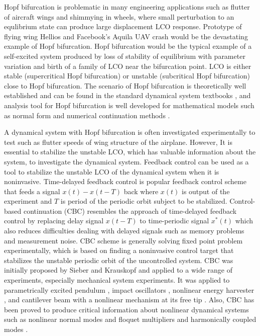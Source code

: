 \documentclass[openacc]{rsproca_new}%
\begin{document}
Hopf bifurcation is problematic in many engineering applications such as flutter of aircraft wings and shimmying in wheels, where small perturbation to an equlibrium state can produce large displacement LCO response. Prototype of flying wing Hellios \cite{noll2004investigation} and Facebook's Aquila UAV crash would be the devastating example of Hopf bifurcation. Hopf bifurcation would be the typical example of a self-excited system produced by loss of stability of equilibrium with parameter variation and birth of a family of LCO near the bifurcation point. LCO is either stable (supercritical Hopf bifurcation) or unstable (subcritical Hopf bifurcation) close to Hopf bifurcation. The scenario of Hopf bifurcation is theoretically well established and can be found in the standard dynamical system textbooks \cite{kuznetsov2013elements}, and analysis tool for Hopf bifurcation is well developed for mathematical models such as normal form \cite{yu2002simplest,ashwin1995numerical} and numerical continuation methods \cite{doedel2000auto2000,dankowicz2013recipes}.

A dynamical system with Hopf bifurcation is often investigated experimentally to test such as flutter speeds of wing structure of the airplane. However, It is essential to stabilize the unstable LCO, which has valuable information about the system, to investigate the dynamical system. Feedback control can be used as a tool to stabilize the unstable LCO of the dynamical system when it is noninvasive. Time-delayed feedback control \cite{pyragas2006delayed,sieber2016generic} is popular feedback control scheme that feeds a signal $x(t)-x(t-T)$ back where $x(t)$ is output of the experiment and $T$ is period of the periodic orbit subject to be stabilized. Control-based continuation (CBC) resembles the approach of time-delayed feedback control by replacing delay signal $x(t-T)$ to time-periodic signal $x^*(t)$ which also reduces difficulties dealing with delayed signals such as memory problems and measurement noise. CBC scheme is generally solving fixed point problem experimentally, which is based on finding a noninvasive control target that stabilizes the unstable periodic orbit of the uncontrolled system. CBC was initially proposed by Sieber and Krauskopf \cite{sieber2008control} and applied to a wide range of experiments, especially mechanical system experiments. It was applied to parametrically excited pendulum \cite{sieber2011control}, impact oscillators \cite{bureau2013experimental,bureau2014experimental}, nonlinear energy harvester \cite{barton2013systematic,barton2011numerical}
, and cantilever beam with a nonlinear mechanism at its free tip \cite{renson2019application}. Also, CBC has been proved to produce critical information about nonlinear dynamical systems such as nonlinear normal modes \cite{renson2016robust,renson2016experimental} and floquet multipliers \cite{barton2017control} and harmonically coupled modes \cite{renson2019application}.
\end{document}
